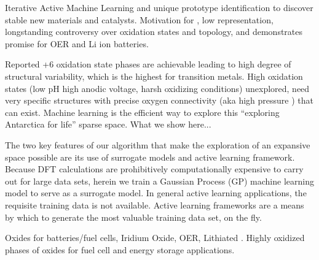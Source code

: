 

Iterative Active Machine Learning and unique prototype identification to discover stable new materials and catalysts.
Motivation for , low representation, longstanding controversy over oxidation states and topology, and demonstrates promise for OER and Li ion batteries.

Reported +6 oxidation state phases are achievable leading to high degree of structural variability, which is the highest for transition metals.
High oxidation states (low pH high anodic voltage, harsh oxidizing conditions) unexplored, need very specific structures with precise oxygen connectivity (aka high pressure ) that can exist.
Machine learning is the efficient way to explore this “exploring Antarctica for life” sparse space.
What we show here...

The two key features of our algorithm that make the exploration of an expansive space possible are its use of surrogate models and active learning framework.
Because DFT calculations are prohibitively computationally expensive to carry out for large data sets, herein we train a Gaussian Process (GP) machine learning model to serve as a surrogate model.
In general active learning applications, the requisite training data is not available.
Active learning frameworks are a means by which to generate the most valuable training data set, on the fly.




Oxides for batteries/fuel cells, Iridium Oxide, OER, Lithiated .
Highly oxidized phases of oxides for fuel cell and energy storage applications.
